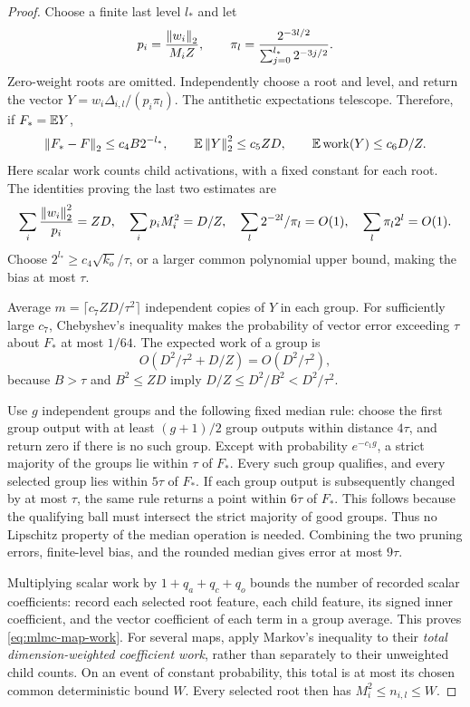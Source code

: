 \begin{proof}
Choose a finite last level $l_*$ and let
\[
 p_i=\frac{\left\|w_i\right\|_2}{M_iZ},\qquad
 \pi_l=\frac{2^{-3l/2}}{\sum_{j=0}^{l_*}2^{-3j/2}}.
\]
Zero-weight roots are omitted. Independently choose a root and level,
and return the vector $Y=w_i\Delta_{i,l}/(p_i\pi_l)$.
The antithetic expectations telescope. Therefore, if $F_*=\mathbb E Y$,
\begin{equation}\label{eq:mlmc-root-estimates}
 \left\|F_*-F\right\|_2\le c_4B2^{-l_*},\qquad
 \mathbb E\left\|Y\right\|_2^2\le c_5ZD,
 \qquad \mathbb E\operatorname{work}(Y)\le c_6D/Z.
\end{equation}
Here scalar work counts child activations, with a fixed constant for
each root. The identities proving the last two estimates are
\[
 \sum_i\frac{\left\|w_i\right\|_2^2}{p_i}=ZD,\quad
 \sum_i p_iM_i^2=D/Z,\quad
 \sum_l2^{-2l}/\pi_l=O(1),\quad
 \sum_l\pi_l2^l=O(1).
\]
Choose $2^{l_*}\ge c_4\sqrt{k_o}/\tau$, or a larger common polynomial
upper bound, making the bias at most $\tau$.

Average $m=\lceil c_7ZD/\tau^2\rceil$ independent copies of $Y$ in
each group. For sufficiently large $c_7$, Chebyshev's inequality makes
the probability of vector error exceeding $\tau$ about $F_*$ at most
$1/64$. The expected work of a group is
\[
 O(D^2/\tau^2+D/Z)=O(D^2/\tau^2),
\]
because $B>\tau$ and $B^2\le ZD$ imply
$D/Z\le D^2/B^2<D^2/\tau^2$.

Use $g$ independent groups and the following fixed median rule: choose
the first group output with at least $(g+1)/2$ group outputs within
distance $4\tau$, and return zero if there is no such group. Except
with probability $e^{-c_1g}$, a strict majority of the groups lie
within $\tau$ of $F_*$. Every such group qualifies, and every selected
group lies within $5\tau$ of $F_*$. If each group output is subsequently
changed by at most $\tau$, the same rule returns a point within
$6\tau$ of $F_*$. This follows because the qualifying ball must
intersect the strict majority of good groups. Thus no Lipschitz property
of the median operation is needed. Combining the two pruning errors,
finite-level bias, and the rounded median gives error at most $9\tau$.

Multiplying scalar work by $1+q_a+q_c+q_o$ bounds the number of recorded
scalar coefficients: record each selected root feature, each child
feature, its signed inner coefficient, and the vector coefficient of
each term in a group average. This proves \eqref{eq:mlmc-map-work}.
For several maps, apply Markov's inequality to their \emph{total
dimension-weighted coefficient work}, rather than separately to their
unweighted child counts. On an event of constant probability, this
total is at most its chosen common deterministic bound $W$. Every
selected root then has $M_i^2\le n_{i,l}\le W$.


\end{proof}
